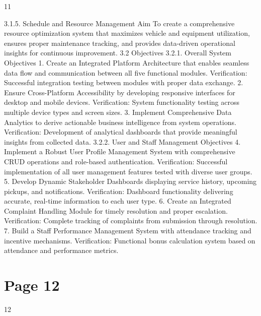 \documentclass{article}
\begin{document}
 
 11  
 
 
    3.1.5. Schedule and Resource Management Aim 
To create a comprehensive resource optimization system that maximizes vehicle and 
equipment utilization, ensures proper maintenance tracking, and provides data-driven 
operational insights for continuous improvement. 
3.2 Objectives 
    3.2.1. Overall System Objectives 
1. Create an Integrated Platform Architecture that enables seamless data flow and 
communication between all five functional modules. 
Verification: Successful integration testing between modules with proper data 
exchange. 
2. Ensure Cross-Platform Accessibility by developing responsive interfaces for desktop 
and mobile devices. 
Verification: System functionality testing across multiple device types and screen sizes. 
3. Implement Comprehensive Data Analytics to derive actionable business intelligence 
from system operations. 
Verification: Development of analytical dashboards that provide meaningful insights 
from collected data. 
    3.2.2. User and Staff Management Objectives 
4. Implement a Robust User Profile Management System with comprehensive CRUD 
operations and role-based authentication. 
Verification: Successful implementation of all user management features tested with 
diverse user groups. 
5. Develop Dynamic Stakeholder Dashboards displaying service history, upcoming 
pickups, and notifications. 
Verification: Dashboard functionality delivering accurate, real-time information to each 
user type. 
6. Create an Integrated Complaint Handling Module for timely resolution and proper 
escalation. 
Verification: Complete tracking of complaints from submission through resolution. 
7. Build a Staff Performance Management System with attendance tracking and 
incentive mechanisms. 
Verification: Functional bonus calculation system based on attendance and performance 
metrics. 

\section*{Page 12}
   
 
 12  
 
\end{document}
